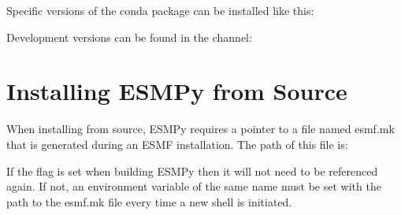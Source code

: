 \documentclass[letterpaper,10pt,english]{sphinxmanual}
\begin{document}
\begin{sphinxVerbatim}[commandchars=\\\{\}]
      
\end{sphinxVerbatim}

Specific versions of the conda package can be installed like this:

\begin{sphinxVerbatim}[commandchars=\\\{\}]
      
\end{sphinxVerbatim}

Development versions can be found in the  channel:

\begin{sphinxVerbatim}[commandchars=\\\{\}]
        
\end{sphinxVerbatim}


\section{Installing ESMPy from Source}
\label{\detokenize{install:installing-esmpy-from-source}}
When installing from source, ESMPy requires a pointer to a file named esmf.mk
that is generated during an ESMF installation.  The path of this file is:

\begin{sphinxVerbatim}[commandchars=\\\{\}]
\end{sphinxVerbatim}

If the  flag is set when building ESMPy then it will not need to be
referenced again.  If not, an environment variable of the same name must be set
with the path to the esmf.mk file every time a new shell is initiated.
\end{document}
